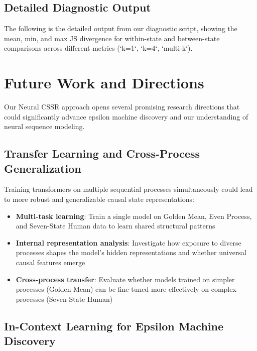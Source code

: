 \documentclass[11pt]{article}
\begin{document}
\subsection{Detailed Diagnostic Output}

The following is the detailed output from our diagnostic script, showing the mean, min, and max JS divergence for within-state and between-state comparisons across different metrics (`k=1`, `k=4`, `multi-k`).

\begin{codebox}

\end{codebox}

\section{Future Work and Directions}

Our Neural CSSR approach opens several promising research directions that could significantly advance epsilon machine discovery and our understanding of neural sequence modeling.

\subsection{Transfer Learning and Cross-Process Generalization}

\begin{notebox}
Training transformers on multiple sequential processes simultaneously could lead to more robust and generalizable causal state representations:
\begin{itemize}
    \item \textbf{Multi-task learning}: Train a single model on Golden Mean, Even Process, and Seven-State Human data to learn shared structural patterns
    \item \textbf{Internal representation analysis}: Investigate how exposure to diverse processes shapes the model's hidden representations and whether universal causal features emerge
    \item \textbf{Cross-process transfer}: Evaluate whether models trained on simpler processes (Golden Mean) can be fine-tuned more effectively on complex processes (Seven-State Human)
\end{itemize}
\end{notebox}

\subsection{In-Context Learning for Epsilon Machine Discovery}
\end{document}
